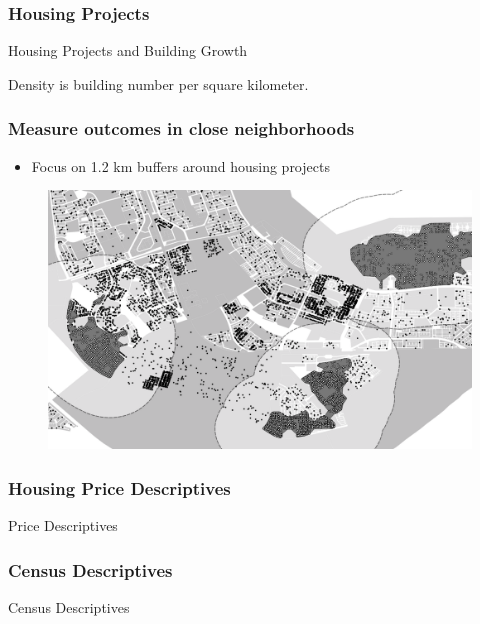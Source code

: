 \documentclass[aspectratio=149]{beamer}
\begin{document}

\begin{frame}
\frametitle{Housing Projects}
\begin{table}
\caption{Housing Projects and Building Growth}

\end{table}
\vspace{.2cm} 
Density is building number per square kilometer.
\end{frame}


\begin{frame}
\frametitle{Measure outcomes in close neighborhoods}
\begin{itemize}
  \item Focus on 1.2 km buffers around housing projects
\end{itemize}
\begin{center}
\begin{figure}
\includegraphics[scale=0.30]{design2.png}
\vspace{-3mm}
\end{figure}
\end{center}
\end{frame}


\begin{frame}
\frametitle{Housing Price Descriptives}
\begin{table}
\caption{Price Descriptives}
\centering
\resizebox{.95\textwidth}{!}{  

}
\end{table}
\end{frame}


\begin{frame}
\frametitle{Census Descriptives}

\begin{table}
\caption{Census Descriptives}
\centering
\resizebox{\textwidth}{!}{  

}
\end{table}


\end{frame}
\end{document}
